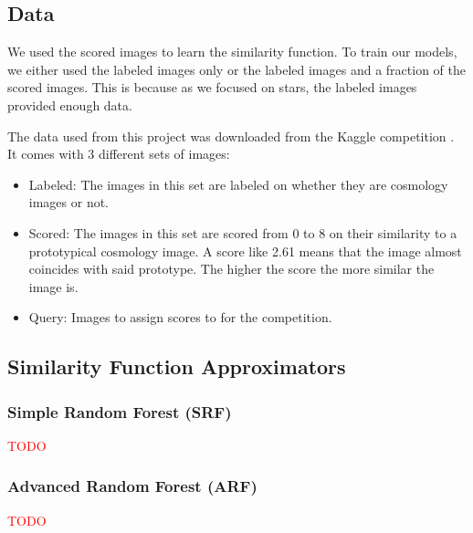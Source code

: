 \documentclass[10pt,conference,compsocconf]{IEEEtran}
\newcommand\TODO[1]{\textcolor{red}{#1}} %
\begin{document}
\subsection{Data}
We used the scored images to learn the similarity function. To train our models, we either used the labeled images only or the labeled images and a fraction of the scored images. This is because as we focused on stars, the labeled images provided enough data.

The data used from this project was downloaded from the Kaggle competition \cite{Kaggle}. It comes with 3 different sets of images:
\begin{itemize}
    \item Labeled: The images in this set are labeled on whether they are cosmology images or not.
    \item Scored: The images in this set are scored from 0 to 8 on their similarity to a prototypical cosmology image. A score like 2.61 means that the image almost coincides with said prototype. The higher the score the more similar the image is.
    \item Query: Images to assign scores to for the competition.
\end{itemize}


\subsection{Similarity Function Approximators}
\subsubsection{Simple Random Forest (SRF)} %
\TODO{TODO}

\subsubsection{Advanced Random Forest (ARF)} %
\TODO{TODO}
\end{document}
